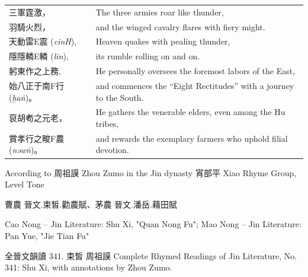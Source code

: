\begin{longtable}{p{} p{}}





三軍霆激， &
The three armies roar like thunder,\\

羽騎火烈， &
and the winged cavalry flares with fiery might.\\

天動雷E震 (\textit{cinH}),
&
Heaven quakes with pealing thunder,\\

隱隱轔E轔 (\textit{lin}),
&
its rumble rolling on and on.\\

躬東作之上務, &
He personally oversees the foremost labors of the East,\\

始八正于南F行 (\textit{ḫaṅ})。
&
and commences the ``Eight Rectitudes'' with a journey to the South.\\

裒胡耇之元老， &
He gathers the venerable elders, even among the Hu tribes,\\

賞孝行之畯F農 (\textit{nəwṅ})。
&
and rewards the exemplary farmers who uphold filial devotion.\\

\end{longtable}



According to 周祖謨 Zhou Zumo in the Jin dynasty 
宵部平 Xiao Rhyme Group, Level Tone


曹農 晉文.束皙.勸農賦、茅農 晉文.潘岳.藉田賦

Cao Nong – Jin Literature: Shu Xi, "Quan Nong Fu"; Mao Nong – Jin Literature: Pan Yue, "Jie Tian Fu"


全晉文韻讀 341. 束皙 周祖謨
Complete Rhymed Readings of Jin Literature, No. 341: Shu Xi, with annotations by Zhou Zumo.

